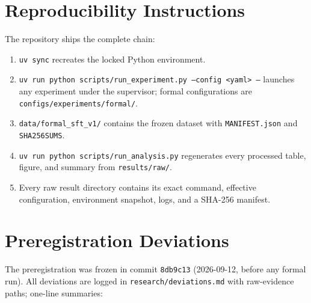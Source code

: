 \documentclass[10pt,twocolumn]{article}
\begin{document}



\appendix
\section{Reproducibility Instructions}
\label{app:repro}
The repository ships the complete chain:
\begin{enumerate}
  \item \texttt{uv sync} recreates the locked Python environment.
  \item \texttt{uv run python scripts/run\_experiment.py --config <yaml> --}
        launches any experiment under the supervisor; formal configurations
        are \texttt{configs/experiments/formal/}.
  \item \texttt{data/formal\_sft\_v1/} contains the frozen dataset with
        \texttt{MANIFEST.json} and \texttt{SHA256SUMS}.
  \item \texttt{uv run python scripts/run\_analysis.py} regenerates every
        processed table, figure, and summary from \texttt{results/raw/}.
  \item Every raw result directory contains its exact command, effective
        configuration, environment snapshot, logs, and a SHA-256 manifest.
\end{enumerate}

\section{Preregistration Deviations}
\label{app:deviations}
The preregistration was frozen in commit \texttt{8db9c13}
(2026-09-12, before any formal run). All deviations are logged in
\texttt{research/deviations.md} with raw-evidence paths; one-line
summaries:
\end{document}
